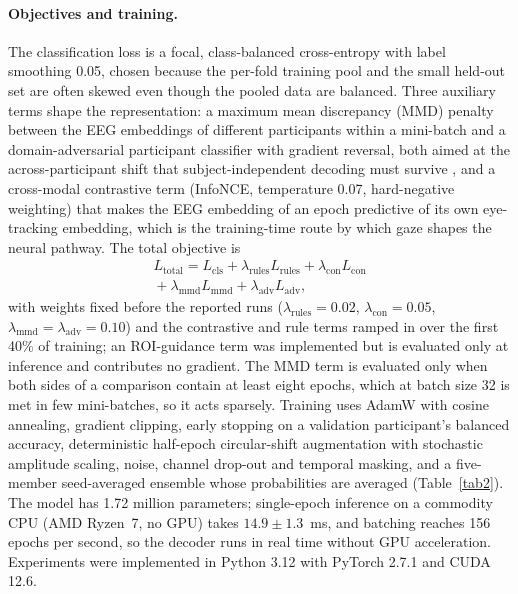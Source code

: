 \paragraph{Objectives and training.} The classification loss is a focal, class-balanced cross-entropy \cite{ref48,ref49} with label smoothing 0.05, chosen because the per-fold training pool and the small held-out set are often skewed even though the pooled data are balanced. Three auxiliary terms shape the representation: a maximum mean discrepancy (MMD) penalty between the EEG embeddings of different participants within a mini-batch and a domain-adversarial participant classifier with gradient reversal, both aimed at the across-participant shift that subject-independent decoding must survive \cite{ref31,ref32}, and a cross-modal contrastive term (InfoNCE, temperature 0.07, hard-negative weighting) that makes the EEG embedding of an epoch predictive of its own eye-tracking embedding, which is the training-time route by which gaze shapes the neural pathway. The total objective is
\begin{multline}
L_{\mathrm{total}} = L_{\mathrm{cls}} + \lambda_{\mathrm{rules}} L_{\mathrm{rules}} + \lambda_{\mathrm{con}} L_{\mathrm{con}} \\
{} + \lambda_{\mathrm{mmd}} L_{\mathrm{mmd}} + \lambda_{\mathrm{adv}} L_{\mathrm{adv}}, \label{eq26}
\end{multline}
with weights fixed before the reported runs ($\lambda_{\mathrm{rules}}=0.02$, $\lambda_{\mathrm{con}}=0.05$, $\lambda_{\mathrm{mmd}}=\lambda_{\mathrm{adv}}=0.10$) and the contrastive and rule terms ramped in over the first 40\% of training; an ROI-guidance term was implemented but is evaluated only at inference and contributes no gradient. The MMD term is evaluated only when both sides of a comparison contain at least eight epochs, which at batch size 32 is met in few mini-batches, so it acts sparsely. Training uses AdamW with cosine annealing, gradient clipping, early stopping on a validation participant's balanced accuracy, deterministic half-epoch circular-shift augmentation with stochastic amplitude scaling, noise, channel drop-out and temporal masking, and a five-member seed-averaged ensemble whose probabilities are averaged (Table~\ref{tab2}). The model has 1.72 million parameters; single-epoch inference on a commodity CPU (AMD Ryzen~7, no GPU) takes $14.9\pm1.3$~ms, and batching reaches 156 epochs per second, so the decoder runs in real time without GPU acceleration. Experiments were implemented in Python 3.12 with PyTorch 2.7.1 and CUDA 12.6.

